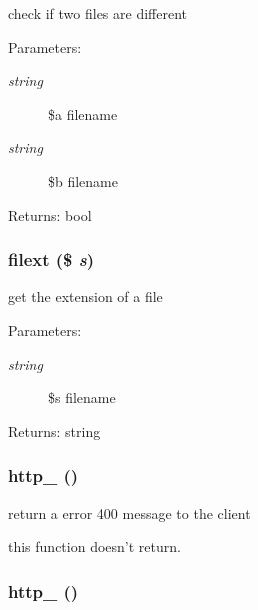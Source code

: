 check if two files are different

\begin{Desc}
\item[Parameters:]
\begin{description}
\item[{\em string}]\$a filename \item[{\em string}]\$b filename \end{description}
\end{Desc}
\begin{Desc}
\item[Returns:]bool \end{Desc}
\hypertarget{util_8inc_8php_6d9392e51344c2e8720a0c1982ebea21}{
\subsubsection[{filext}]{\setlength{\rightskip}{0pt plus 5cm}filext (\$ {\em s})}}
\label{util_8inc_8php_6d9392e51344c2e8720a0c1982ebea21}


get the extension of a file

\begin{Desc}
\item[Parameters:]
\begin{description}
\item[{\em string}]\$s filename \end{description}
\end{Desc}
\begin{Desc}
\item[Returns:]string \end{Desc}
\hypertarget{util_8inc_8php_78288ca93c62ce2b5ef34f40352c7324}{
\subsubsection[{http\_\-400}]{\setlength{\rightskip}{0pt plus 5cm}http\_ ()}}
\label{util_8inc_8php_78288ca93c62ce2b5ef34f40352c7324}


return a error 400 message to the client

this function doesn't return. \hypertarget{util_8inc_8php_24f09c2c8205022b013bbee5293a38ae}{
\subsubsection[{http\_\-404}]{\setlength{\rightskip}{0pt plus 5cm}http\_ ()}}
\label{util_8inc_8php_24f09c2c8205022b013bbee5293a38ae}


